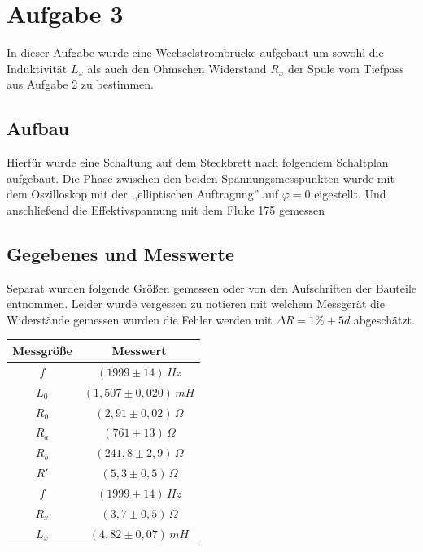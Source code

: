 \section{Aufgabe 3}
In dieser Aufgabe wurde eine Wechselstrombrücke aufgebaut um sowohl die Induktivität \(L_x\) als auch den Ohmschen Widerstand \(R_x\) der Spule vom Tiefpass aus Aufgabe 2 zu bestimmen. 

\subsection{Aufbau}
Hierfür wurde eine Schaltung auf dem Steckbrett nach folgendem Schaltplan aufgebaut. Die Phase zwischen den beiden Spannungsmesspunkten wurde mit dem Oszilloskop mit der ,,elliptischen Auftragung'' auf \(\varphi = 0 \) eigestellt. Und anschließend die Effektivspannung mit dem Fluke 175 gemessen
\begin{center}
\begin{minipage}{\linewidth}
\centering
{}
\end{minipage}
\end{center}

\subsection{Gegebenes und Messwerte}
Separat wurden folgende Größen gemessen oder von den Aufschriften der Bauteile entnommen. Leider wurde vergessen zu notieren mit welchem Messgerät die Widerstände gemessen wurden die Fehler werden mit \(\Delta R = 1\% + 5d\) abgeschätzt.
\begin{center}
\begin{tabular}{c|c}
Messgröße & Messwert\\\hline
\(f\) & \((1999 \pm 14)\, Hz \) \\
\(L_0\) & \((1,507 \pm 0,020)\, mH \) \\
\(R_0\) & \((2,91 \pm 0,02)\, \Omega \) \\
\(R_a\) & \((761 \pm 13)\, \Omega \) \\
\(R_b\) & \((241,8 \pm 2,9)\, \Omega \) \\
\(R'\) & \((5,3 \pm 0,5)\, \Omega \) \\
\(f\) & \((1999 \pm 14)\, Hz \) \\ \hline
\(R_x\) & \(\left(3,7 \pm 0,5 \right)\, \Omega \) \\
\(L_x\) & \((4,82\pm 0,07)\, mH \) \\
\end{tabular}
%
\end{center}

